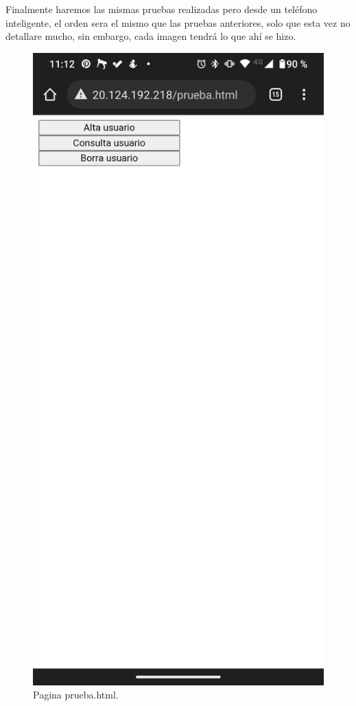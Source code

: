 \documentclass[11pt]{article}
\begin{document}
		Finalmente haremos las mismas pruebas realizadas pero desde un teléfono inteligente, el orden sera el mismo que las pruebas anteriores, solo que esta vez no detallare mucho, sin embargo, cada imagen tendrá lo que ahí se hizo.
		\begin{figure}[H]
			\centering
			\includegraphics[scale=0.18]{resources/Screenshot_20211219-231247.png}
			\caption{Pagina prueba.html.}\label{fig:picture}
		\end{figure}
\end{document}
